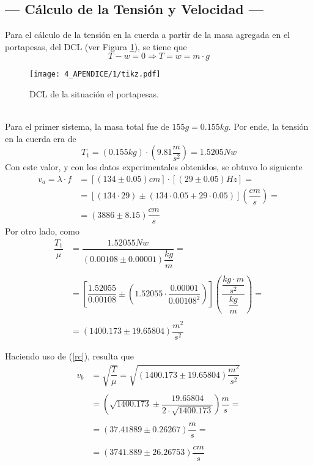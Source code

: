 \documentclass[10pt,a4paper]{article}
\begin{document}
	
	\subsection{--- Cálculo de la Tensión y Velocidad ---}
	
	Para el cálculo de la tensión en la cuerda a partir de la masa agregada en el portapesas, del DCL (ver Figura \ref{fig:dcl}), se tiene que $$ T-w=0\Longrightarrow T=w=m\cdot g$$
	\begin{figure}[hbt!]
		\centering
		\texttt{[image: 4\_APENDICE/1/tikz.pdf]}
		\caption{DCL de la situación el portapesas.}
		\label{fig:dcl}
	\end{figure}\\
 	Para el primer sistema, la masa total fue de $ 155 g=0.155 kg $. Por ende, la tensión en la cuerda era de 
 	$$T_1=(0.155 kg)\cdot \left(9.81\frac{m}{s^2}\right)=1.5205 Nw$$
 	Con este valor, y con los datos experimentales obtenidos, se obtuvo lo siguiente
 	\begin{align*}
 		v_a=\lambda\cdot f&=[(134\pm0.05)cm]\cdot[(29\pm 0.05)Hz]=\\
 		&=[(134\cdot29)\pm(134\cdot0.05+ 29\cdot0.05)]\left(\dfrac{cm}{s}\right)=\\
 		&=(3886\pm8.15)\dfrac{cm}{s}
 	\end{align*}
 	Por otro lado, como
 	\begin{align*}
 		\dfrac{T_1}{\mu}&=\dfrac{1.52055 Nw}{(0.00108\pm 0.00001)\dfrac{kg}{m}}=\\\\
 		&=\left[\dfrac{1.52055}{0.00108}\pm\left(1.52055\cdot\dfrac{0.00001}{0.00108^2}\right)\right]\left(\dfrac{\dfrac{kg\cdot m}{s^2}}{\dfrac{kg}{m}}\right)=\\\\
 		&=(1400.173\pm19.65804)\dfrac{m^2}{s^2}
 	\end{align*}
 	
 	Haciendo uso de (\ref{rc}), resulta que
 	\begin{align*}
 		v_b&=\sqrt{\dfrac{T}{\mu}}=\sqrt{(1400.173\pm19.65804)\dfrac{m^2}{s^2}}\\\\
 		&=\left(\sqrt{1400.173}\pm\dfrac{19.65804}{2\cdot\sqrt{1400.173}}\right)\dfrac{m}{s}=\\\\
 		&=(37.41889\pm 0.26267)\dfrac{m}{s}=\\\\
 		&=(3741.889\pm 26.26753)\dfrac{cm}{s}
 	\end{align*}
 
\end{document}
